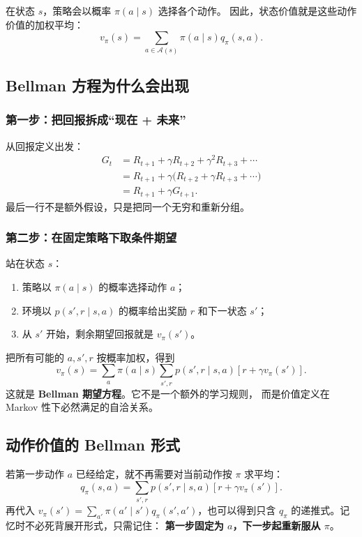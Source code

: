 \documentclass[11pt,a4paper,fontset=fandol]{ctexart}
\newcommand{\Aset}{\mathcal{A}}
\newcommand{\vpi}{v_{\pi}}
\newcommand{\qpi}{q_{\pi}}
\begin{document}
\begin{intuitionbox}[状态价值与动作价值的关系]
在状态 \(s\)，策略会以概率 \(\pi(a\mid s)\) 选择各个动作。
因此，状态价值就是这些动作价值的加权平均：
\[
\boxed{
\vpi(s)=\sum_{a\in\Aset(s)}\pi(a\mid s)\qpi(s,a)
}.
\]
\end{intuitionbox}

\subsection{Bellman 方程为什么会出现}

\subsubsection{第一步：把回报拆成“现在 + 未来”}

从回报定义出发：
\[
\begin{aligned}
G_t
&=R_{t+1}+\gamma R_{t+2}+\gamma^2R_{t+3}+\cdots\\
&=R_{t+1}+\gamma
\bigl(R_{t+2}+\gamma R_{t+3}+\cdots\bigr)\\
&=\boxed{R_{t+1}+\gamma G_{t+1}}.
\end{aligned}
\]
最后一行不是额外假设，只是把同一个无穷和重新分组。

\subsubsection{第二步：在固定策略下取条件期望}

站在状态 \(s\)：

\begin{enumerate}
  \item 策略以 \(\pi(a\mid s)\) 的概率选择动作 \(a\)；
  \item 环境以 \(p(s',r\mid s,a)\) 的概率给出奖励 \(r\) 和下一状态 \(s'\)；
  \item 从 \(s'\) 开始，剩余期望回报就是 \(\vpi(s')\)。
\end{enumerate}

把所有可能的 \(a,s',r\) 按概率加权，得到
\[
\boxed{
\vpi(s)
=
\sum_a \pi(a\mid s)
\sum_{s',r}p(s',r\mid s,a)
\left[r+\gamma\vpi(s')\right]
}.
\]
这就是 \textbf{Bellman 期望方程}。它不是一个额外的学习规则，
而是价值定义在 Markov 性下必然满足的自洽关系。

\subsection{动作价值的 Bellman 形式}

若第一步动作 \(a\) 已经给定，就不再需要对当前动作按 \(\pi\) 求平均：
\[
\boxed{
\qpi(s,a)
=
\sum_{s',r}p(s',r\mid s,a)
\left[r+\gamma\vpi(s')\right]
}.
\]
再代入 \(\vpi(s')=\sum_{a'}\pi(a'\mid s')\qpi(s',a')\)，也可以得到只含
\(q_\pi\) 的递推式。记忆时不必死背展开形式，只需记住：
\textbf{第一步固定为 \(a\)，下一步起重新服从 \(\pi\)}。
\end{document}
